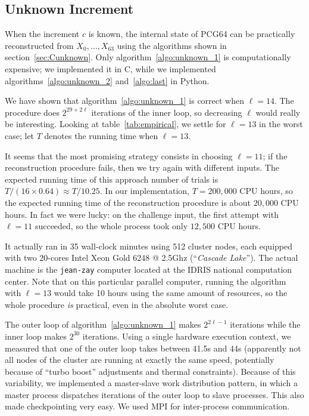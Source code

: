 \documentclass[submission,svgnames,journal=tosc]{iacrtrans}
\begin{document}
\subsection{Unknown Increment}

When the increment $c$ is known, the internal state of \textsf{PCG64} can be
practically reconstructed from $X_0, \dots, X_{63}$ using the algorithms shown
in section~\ref{sec:Cunknown}. Only algorithm~\ref{algo:unknown_1} is
computationally expensive; we implemented it in \textsf{C}, while we implemented
algorithms~\ref{algo:unknown_2} and~\ref{algo:last} in \textsf{Python}.

We have shown that algorithm~\ref{algo:unknown_1} is correct when $\ell=14$. The
procedure does $2^{29 + 2\ell}$ iterations of the inner loop, so decreasing
$\ell$ would really be interesting. Looking at table~\ref{tab:empirical}, we
settle for $\ell=13$ in the worst case; let $T$ denotes the running time when
$\ell=13$.

It seems that the most promising strategy consists in choosing $\ell=11$; if the
reconstruction procedure fails, then we try again with different inputs. The
expected running time of this approach number of trials is
$T/(16 \times 0.64) \approx T / 10.25$. In our implementation, $T = 200,000$ CPU
hours, so the expected running time of the reconstruction procedure is about
$20,000$ CPU hours. In fact we were lucky: on the challenge input, the first
attempt with $\ell=11$ succeeded, so the whole process took only $12,500$ CPU
hours.

It actually ran in 35 wall-clock minutes using 512 cluster nodes, each equipped
with two 20-cores \textsf{Intel Xeon Gold 6248 @ 2.5Ghz} (``\emph{Cascade
  Lake}''). The actual machine is the \texttt{jean-zay} computer located at the
IDRIS national computation center. Note that on this particular parallel
computer, running the algorithm with $\ell=13$ would take 10 hours using the
same amount of resources, so the whole procedure \emph{is} practical, even in
the absolute worst case.

The outer loop of algorithm~\ref{algo:unknown_1} makes $2^{2\ell - 1}$
iterations while the inner loop makes $2^{30}$ iterations. Using a single
hardware execution context, we measured that one of the outer loop takes between
41.5s and 44s (apparently not all nodes of the cluster are running at exactly
the same speed, potentially because of ``turbo boost'' adjustments and thermal
constraints). Because of this variability, we implemented a master-slave work
distribution pattern, in which a master process dispatches iterations of the
outer loop to slave processes. This also made checkpointing very easy. We used
\textsf{MPI} for inter-process communication.
\end{document}
